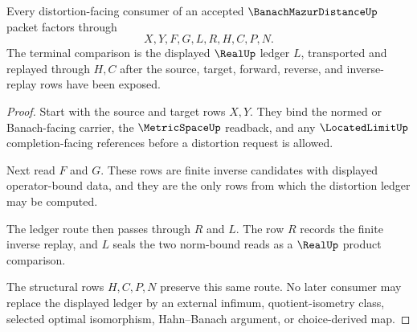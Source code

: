 \begin{theorem}
\label{thm:banach-mazur-distance-distortion-ledger-route}
Every distortion-facing consumer of an accepted $\BanachMazurDistanceUp$ packet factors through
$$
X,Y,F,G,L,R,H,C,P,N .
$$
The terminal comparison is the displayed $\RealUp$ ledger $L$, transported and replayed through $H,C$ after the source, target, forward, reverse, and inverse-replay rows have been exposed.
\end{theorem}
\begin{proof}
Start with the source and target rows $X,Y$. They bind the normed or Banach-facing carrier, the $\MetricSpaceUp$ readback, and any $\LocatedLimitUp$ completion-facing references before a distortion request is allowed.

Next read $F$ and $G$. These rows are finite inverse candidates with displayed operator-bound data, and they are the only rows from which the distortion ledger may be computed.

The ledger route then passes through $R$ and $L$. The row $R$ records the finite inverse replay, and $L$ seals the two norm-bound reads as a $\RealUp$ product comparison.

The structural rows $H,C,P,N$ preserve this same route. No later consumer may replace the displayed ledger by an external infimum, quotient-isometry class, selected optimal isomorphism, Hahn--Banach argument, or choice-derived map.
\end{proof}

